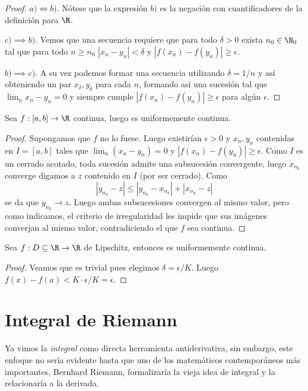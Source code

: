 \documentclass[11pt,oneside,a4paper]{book}
\begin{document}
\begin{proof}
$a)\iff b)$. Nótese que la expresión $b)$ es la negación con cuantificadores de la definición para $\R$.

$c)\implies b)$. Vemos que una secuencia requiere que para todo $\delta\gt 0$ exista $n_0\in\N_0$ tal que para todo $n\geq n_0$ $|x_n-y_n|\lt\delta$ y $|f(x_n)-f(y_n)|\geq\epsilon$.

$b)\implies c)$. A su vez podemos formar una secuencia utilizando $\delta=1/n$ y así obteniendo un par $x_\delta,y_\delta$ para cada $n$, formando así una sucesión tal que $\lim_nx_n-y_n=0$ y siempre cumple $|f(x_n)-f(y_n)|\geq\epsilon$ para algún $\epsilon$.
\end{proof}
\begin{thm}
Sea $f:[a,b]\rightarrow\R$ continua,  luego es uniformemente continua.
\end{thm}
\begin{proof}
Supongamos que $f$ no lo fuese. Luego existirían $\epsilon\gt0$ y $x_n,y_n$ contenidas en $I=[a,b]$ tales que $\lim_n(x_n-y_n)=0$ y $|f(x_n)-f(y_n)|\geq\epsilon$. Como $I$ es un cerrado acotado, toda sucesión admite una subsucesión convergente, luego $x_{n_k}$ converge digamos a $z$ contenido en $I$ (por ser cerrado). Como
$$|y_{n_k}-z|\leq|y_{n_k}-x_{n_k}|+|x_{n_k}-z|$$
se da que $y_{n_k}\to z$. Luego ambas subsucesiones convergen al mismo valor, pero como indicamos, el criterio de irregularidad les impide que sus imágenes converjan al mismo valor, contradiciendo el que $f$ sea continua.
\end{proof}
\begin{thm}
Sea $f:D\subseteq\R\rightarrow\R$ de Lipschitz, entonces es uniformemente continua.
\end{thm}
\begin{proof}
Veamos que es trivial pues elegimos $\delta=\epsilon/K$. Luego $f(x)-f(a)\lt K\cdot\epsilon/K=\epsilon$.
\end{proof}

\section{Integral de Riemann}
Ya vimos la \textit{integral} como directa herramienta antiderivativa, sin embargo, este enfoque no sería evidente hasta que uno de los matemáticos contemporáneos más importantes, Bernhard Riemann, formalizaría la vieja idea de integral y la relacionaría a la derivada.
\end{document}
